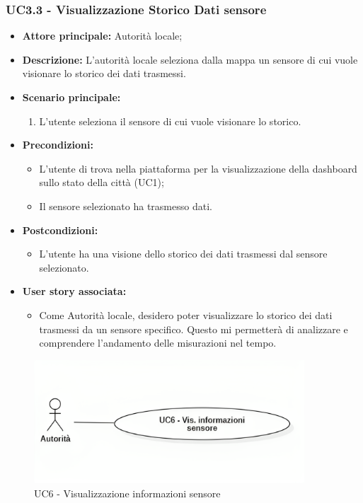 \documentclass{article}
\begin{document}
\subsubsection{UC3.3 - Visualizzazione Storico Dati sensore}
\begin{itemize}
    \item \textbf{Attore principale:} Autorità locale;
    \item \textbf{Descrizione:} L’autorità locale seleziona dalla mappa un sensore di cui vuole visionare lo storico dei dati trasmessi.
    \item \textbf{Scenario principale:}
          \begin{enumerate}
              \item L'utente seleziona il sensore di cui vuole visionare lo storico.
          \end{enumerate}
    \item \textbf{Precondizioni:}
          \begin{itemize}
              \item  L'utente di trova  nella piattaforma per la visualizzazione della dashboard sullo stato della città (UC1);
              \item Il sensore selezionato ha trasmesso dati.
          \end{itemize}
    \item \textbf{Postcondizioni:}
          \begin{itemize}
              \item  L'utente ha una visione dello storico dei dati trasmessi dal sensore selezionato.
          \end{itemize}
    \item \textbf{User story associata:}
          \begin{itemize}
              \item Come Autorità locale, desidero poter visualizzare lo storico dei dati trasmessi da un sensore specifico. Questo mi permetterà di analizzare e comprendere l'andamento delle misurazioni nel tempo.
          \end{itemize}
\end{itemize}


\begin{figure}[H]
    \centering
    \includegraphics[width=0.9\textwidth]{Images/uc6.png}
    \caption{UC6 - Visualizzazione informazioni sensore}
    \label{fig:UC6}
\end{figure}
\end{document}
